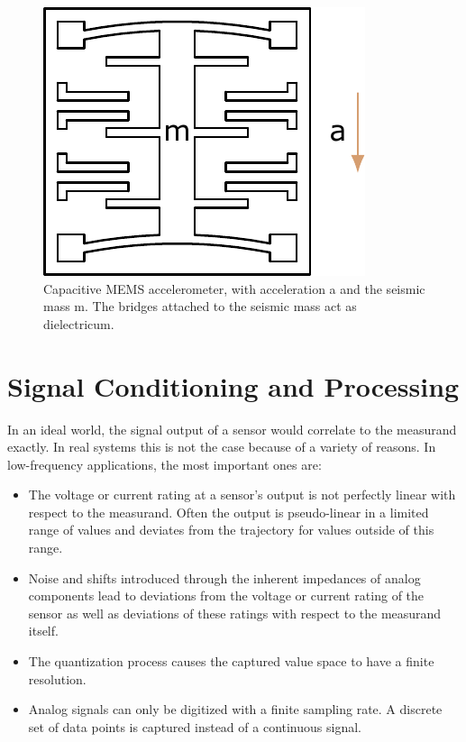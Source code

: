 \begin{figure}[!htb]
  \centering
  \includegraphics[scale=0.7]{figures/measurement/sensors/accelerometer_bent}
  \caption[Capacitive MEMS Accelerometer]{Capacitive MEMS accelerometer, with acceleration a and the seismic mass m. The bridges attached to the seismic mass act as dielectricum.%
    \label{fig:accelerometer_bent}}
\end{figure}

\section{Signal Conditioning and Processing\label{signal_conditioning_processing}}
In an ideal world, the signal output of a sensor would correlate to the measurand exactly. In real systems this is not the case because of a variety of reasons. In low-frequency applications, the most important ones are:

\begin{itemize}
  \item The voltage or current rating at a sensor's output is not perfectly linear with respect to the measurand. Often the output is pseudo-linear in a limited range of values and deviates from the trajectory for values outside of this range.
  \item Noise and shifts introduced through the inherent impedances of analog components lead to deviations from the voltage or current rating of the sensor as well as deviations of these ratings with respect to the measurand itself.
  \item The quantization process causes the captured value space to have a finite resolution.
  \item Analog signals can only be digitized with a finite sampling rate. A discrete set of data points is captured instead of a continuous signal.
\end{itemize}

